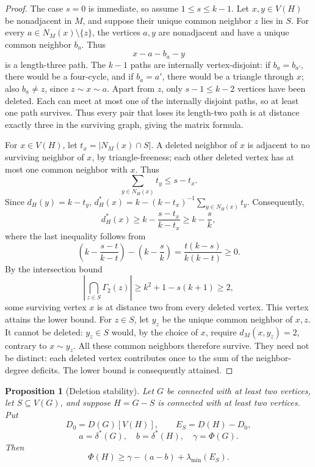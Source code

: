 \documentclass[a4paper,10pt,reqno]{amsart}
\theoremstyle{plain}
\newtheorem{proposition}[theorem]{Proposition}
\theoremstyle{definition}
\theoremstyle{remark}
\newcommand{\resultbox}[1]{\boxed{#1}}
\begin{document}
\begin{proof}
The case \(s=0\) is immediate, so assume \(1\le s\le k-1\).  Let
\(x,y\in V(H)\) be nonadjacent in \(M\), and suppose their unique common
neighbor \(z\) lies in \(S\).  For every
\(a\in N_M(x)\setminus\{z\}\), the vertices \(a,y\) are nonadjacent and
have a unique common neighbor \(b_a\).  Thus
\[
 x-a-b_a-y
\]
is a length-three path.  The \(k-1\) paths are internally vertex-disjoint:
if \(b_a=b_{a'}\), there would be a four-cycle, and if \(b_a=a'\),
there would be a triangle through \(x\); also \(b_a\ne z\), since
\(z\sim x\sim a\).  Apart from \(z\), only
\(s-1\le k-2\) vertices have been deleted. Each can meet at most one of the
internally disjoint paths, so at least one path survives.  Thus every pair that loses its length-two path is
at distance exactly three in the surviving graph, giving the matrix formula.

For \(x\in V(H)\), let \(t_x=|N_M(x)\cap S|\).  A deleted neighbor of
\(x\) is adjacent to no surviving neighbor of \(x\), by triangle-freeness;
each other deleted vertex has at most one common neighbor with \(x\).  Thus
\[
 \sum_{y\in N_H(x)}t_y\le s-t_x.
\]
Since \(d_H(y)=k-t_y\),
\(d_H^*(x)=k-(k-t_x)^{-1}\sum_{y\in N_H(x)}t_y\).
Consequently,
\[
 d_H^*(x)
 \ge k-\frac{s-t_x}{k-t_x}
 \ge k-\frac{s}{k},
\]
where the last inequality follows from
\[
 \left(k-\frac{s-t}{k-t}\right)-\left(k-\frac{s}{k}\right)
 =\frac{t(k-s)}{k(k-t)}\ge0.
\]
By the intersection bound
\[
 \left|\bigcap_{z\in S}\Gamma_2(z)\right|
 \ge k^2+1-s(k+1)\ge2,
\]
some surviving vertex \(x\) is at distance two from every deleted
vertex.  This vertex attains the lower bound.  For \(z\in S\), let
\(y_z\) be the unique common neighbor of \(x,z\).  It cannot be deleted:
\(y_z\in S\) would, by the choice of \(x\), require \(d_M(x,y_z)=2\),
contrary to \(x\sim y_z\).  All these common neighbors therefore survive. They need not be distinct:
each deleted vertex contributes once to the sum of the neighbor-degree
deficits. The lower bound is consequently attained.
\end{proof}

\begin{proposition}[Deletion stability]\label{prop:deletion-stability}
Let \(G\) be connected with at least two vertices, let
\(S\subseteq V(G)\), and suppose \(H=G-S\) is connected with at least two
vertices.  Put
\[
 D_0=D(G)[V(H)],
 \qquad E_S=D(H)-D_0,
\]
\[
 a=\delta^*(G),
 \quad b=\delta^*(H),
 \quad \gamma=\Phi(G).
\]
Then
\[
 \resultbox{
 \Phi(H)\ge\gamma-(a-b)+\lambda_{\min}(E_S).
 }
\]
\end{proposition}
\end{document}
